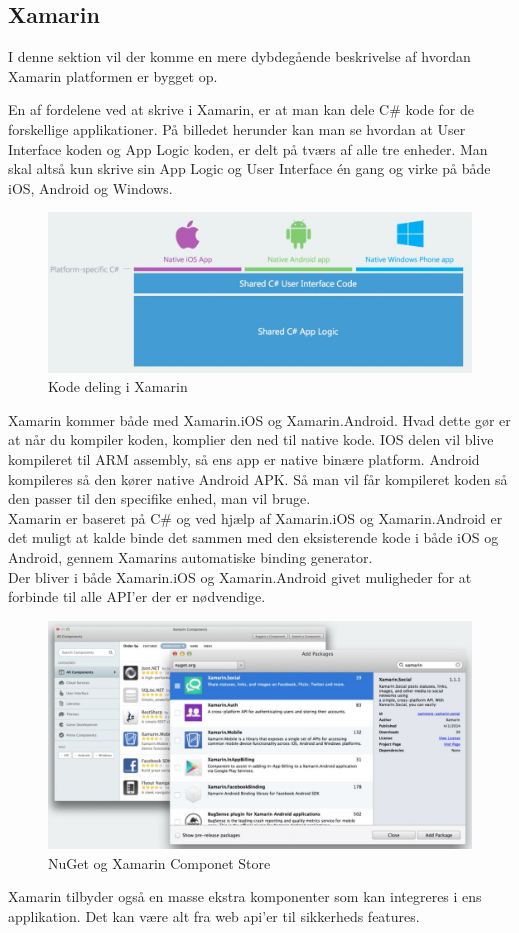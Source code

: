 \subsection{Xamarin}
I denne sektion vil der komme en mere dybdegående beskrivelse af hvordan Xamarin platformen er bygget op.

En af fordelene ved at skrive i Xamarin, er at man kan dele C\# kode for de forskellige applikationer.
På billedet herunder kan man se hvordan at User Interface koden og App Logic koden, er delt på tværs af alle tre enheder. Man skal altså kun skrive sin App Logic og User Interface én gang og virke på både iOS, Android og Windows.
\begin{figure}[H]
	\centering
	\includegraphics[width=1\linewidth]{Applikation/XarmarinShare.JPG}
	\caption{Kode deling i Xamarin}
	\label{fig:CodeShare}
\end{figure}

\clearpage

Xamarin kommer både med Xamarin.iOS og Xamarin.Android. Hvad dette gør er at når du kompiler koden, komplier den ned til native kode. IOS delen vil blive kompileret til ARM assembly, så ens app er native binære platform. Android kompileres så den kører native Android APK. Så man vil får kompileret koden så den passer til den specifike enhed, man vil bruge. \\
Xamarin er baseret på C\# og ved hjælp af Xamarin.iOS og Xamarin.Android er det muligt at kalde binde det sammen med den eksisterende kode i både iOS og Android, gennem Xamarins automatiske binding generator. \\
Der bliver i både Xamarin.iOS og Xamarin.Android givet muligheder for at forbinde til alle API'er der er nødvendige. \\

\begin{figure}[H]
	\centering
	\includegraphics[width=0.7\linewidth]{Applikation/NuGet.JPG}
	\caption{NuGet og Xamarin Componet Store}
	\label{fig:NuGet}
\end{figure}
Xamarin tilbyder også en masse ekstra komponenter som kan integreres i ens applikation. Det kan være alt fra web api'er til sikkerheds features.

\clearpage